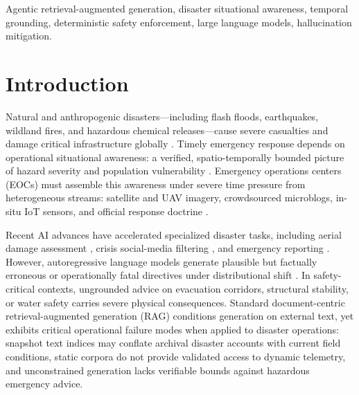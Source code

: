 \documentclass[conference]{IEEEtran}
\begin{document}
\begin{IEEEkeywords}
Agentic retrieval-augmented generation, disaster situational awareness, temporal grounding, deterministic safety enforcement, large language models, hallucination mitigation.
\end{IEEEkeywords}

\section{Introduction}
Natural and anthropogenic disasters---including flash floods, earthquakes, wildland fires, and hazardous chemical releases---cause severe casualties and damage critical infrastructure globally \cite{undrr}. Timely emergency response depends on operational situational awareness: a verified, spatio-temporally bounded picture of hazard severity and population vulnerability \cite{endsley,aboualola2023}. Emergency operations centers (EOCs) must assemble this awareness under severe time pressure from heterogeneous streams: satellite and UAV imagery, crowdsourced microblogs, in-situ IoT sensors, and official response doctrine \cite{crisismmd,aboualola2023}.

Recent AI advances have accelerated specialized disaster tasks, including aerial damage assessment \cite{singh}, crisis social-media filtering \cite{olteanu2015,dinani}, and emergency reporting \cite{cantini}. However, autoregressive language models generate plausible but factually erroneous or operationally fatal directives under distributional shift \cite{ji,yu2024}. In safety-critical contexts, ungrounded advice on evacuation corridors, structural stability, or water safety carries severe physical consequences. Standard document-centric retrieval-augmented generation (RAG) \cite{lewis} conditions generation on external text, yet exhibits critical operational failure modes when applied to disaster operations: snapshot text indices may conflate archival disaster accounts with current field conditions, static corpora do not provide validated access to dynamic telemetry, and unconstrained generation lacks verifiable bounds against hazardous emergency advice.
\end{document}

